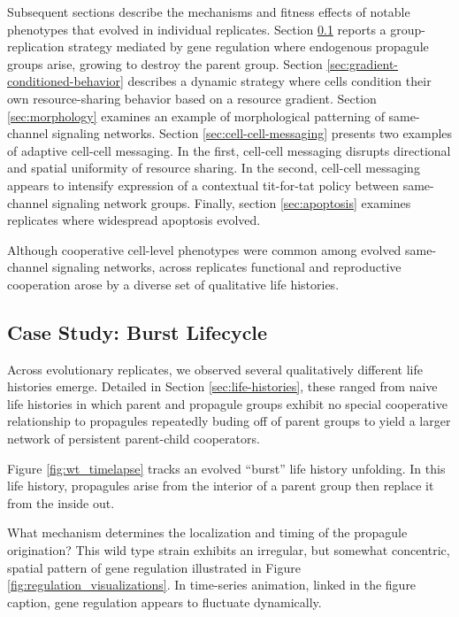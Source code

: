 Subsequent sections describe the mechanisms and fitness effects of notable phenotypes that evolved in individual replicates.
Section \ref{sec:gene-regulation} reports a group-replication strategy mediated by gene regulation where endogenous propagule groups arise, growing to destroy the parent group.
Section \ref{sec:gradient-conditioned-behavior} describes a dynamic strategy where cells condition their own resource-sharing behavior based on a resource gradient.
Section \ref{sec:morphology} examines an example of morphological patterning of same-channel signaling networks.
Section \ref{sec:cell-cell-messaging} presents two examples of adaptive cell-cell messaging.
In the first, cell-cell messaging disrupts directional and spatial uniformity of resource sharing.
In the second, cell-cell messaging appears to intensify expression of a contextual tit-for-tat policy between same-channel signaling network groups.
Finally, section \ref{sec:apoptosis} examines replicates where widespread apoptosis evolved.

Although cooperative cell-level phenotypes were common among evolved same-channel signaling networks, across replicates functional and reproductive cooperation arose by a diverse set of qualitative life histories.

\subsection{Case Study: Burst Lifecycle} \label{sec:gene-regulation}

Across evolutionary replicates, we observed several qualitatively different life histories emerge.
Detailed in Section \ref{sec:life-histories}, these ranged from naive life histories in which parent and propagule groups exhibit no special cooperative relationship to propagules repeatedly buding off of parent groups to yield a larger network of persistent parent-child cooperators.



Figure \ref{fig:wt_timelapse} tracks an evolved ``burst'' life history unfolding.
In this life history, propagules arise from the interior of a parent group then replace it from the inside out.

What mechanism determines the localization and timing of the propagule origination?
This wild type strain exhibits an irregular, but somewhat concentric, spatial pattern of gene regulation illustrated in Figure \ref{fig:regulation_visualizations}.
In time-series animation, linked in the figure caption, gene regulation appears to fluctuate dynamically.

